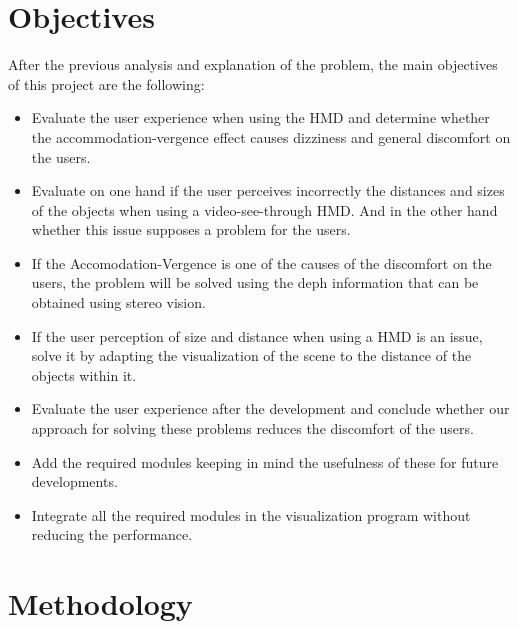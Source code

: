 \documentclass[10pt,a4paper,twocolumn,twoside]{article}
\begin{document}
	\section{Objectives}
	After the previous analysis and explanation of the problem, the main objectives of this project are the following: 

	\begin{itemize}
		\item Evaluate the user experience when using the HMD and determine whether the accommodation-vergence effect causes dizziness and general discomfort on the users. 
		
		\item Evaluate on one hand if the user perceives incorrectly the distances and sizes of the objects when using a video-see-through HMD. And in the other hand whether this issue supposes a problem for the users.
		
		\item If the Accomodation-Vergence is one of the causes of the discomfort on the users, the problem will be solved using the deph information that can be obtained using stereo vision. 
		
		\item If the user perception of size and distance when using a HMD is an issue, solve it by adapting the visualization of the scene to the distance of the objects within it.
		
		\item Evaluate the user experience after the development and conclude whether our approach for solving these problems reduces the discomfort of the users. 
		
		\item Add the required modules keeping in mind the usefulness of these for future developments.
		
		\item Integrate all the required modules in the visualization program without reducing the performance. 
	\end{itemize}

	\section{Methodology}
	
	
\end{document}
